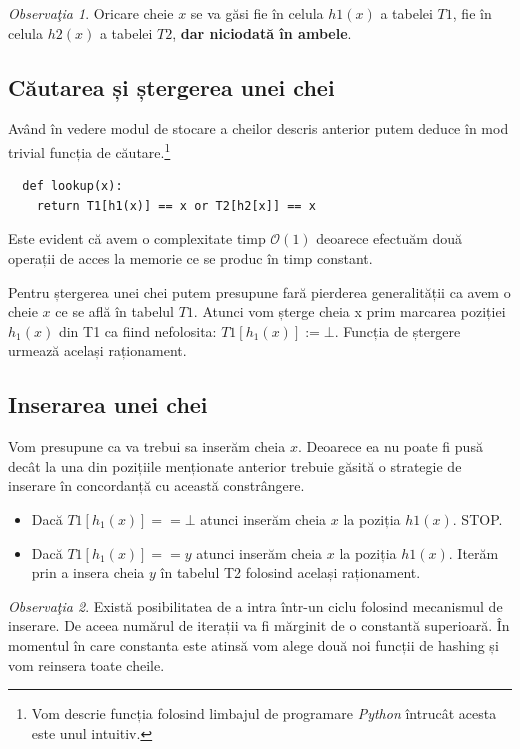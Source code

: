 \documentclass[a4paper]{article}
\theoremstyle{remark}
\newtheorem{remark}{Observa\c{t}ia}
\theoremstyle{definition}
\begin{document}
\begin{remark}
Oricare cheie $x$ se va găsi fie în celula $h1(x)$ a tabelei $T1$, fie în celula $h2(x)$ a tabelei $T2$, \textbf{dar niciodată în ambele}.
\end{remark}

\subsection{Căutarea și ștergerea unei chei}

Având în vedere modul de stocare a cheilor descris anterior putem deduce în mod trivial funcția de căutare.\footnote{Vom descrie funcția folosind limbajul de programare \textit{Python} întrucât acesta este unul intuitiv.}

\begin{verbatim}
  def lookup(x):
   	return T1[h1(x)] == x or T2[h2[x]] == x
\end{verbatim}

Este evident că avem o complexitate timp $\mathcal{O}(1)$ deoarece efectuăm două operații de acces la memorie ce se produc în timp constant.

Pentru ștergerea unei chei putem presupune fară pierderea generalității ca avem o cheie $x$ ce se află în tabelul $T1$. Atunci vom șterge cheia x prim marcarea poziției $h_1(x)$ din T1 ca fiind nefolosita: $T1[h_1(x)] := \bot$. Funcția de ștergere urmează același raționament.

\subsection{Inserarea unei chei}

Vom presupune ca va trebui sa inserăm cheia $x$. Deoarece ea nu poate fi pusă decât la una din pozițiile menționate anterior trebuie găsită o strategie de inserare în concordanță cu această constrângere.

\begin{itemize}
  \item[Cazul 1] Dacă $T1[h_1(x)] == \bot$ atunci inserăm cheia $x$ la poziția $h1(x)$. STOP.
  \item[Cazul 2] Dacă $T1[h_1(x)] == y$ atunci inserăm cheia $x$ la poziția $h1(x)$. Iterăm prin a insera cheia $y$ în tabelul T2 folosind același raționament.
\end{itemize}

\begin{remark}Există posibilitatea de a intra într-un ciclu folosind mecanismul de inserare. De aceea numărul de iterații va fi mărginit de o constantă superioară. În momentul în care constanta este atinsă vom alege două noi funcții de hashing și vom reinsera toate cheile.
\end{remark}
\end{document}
